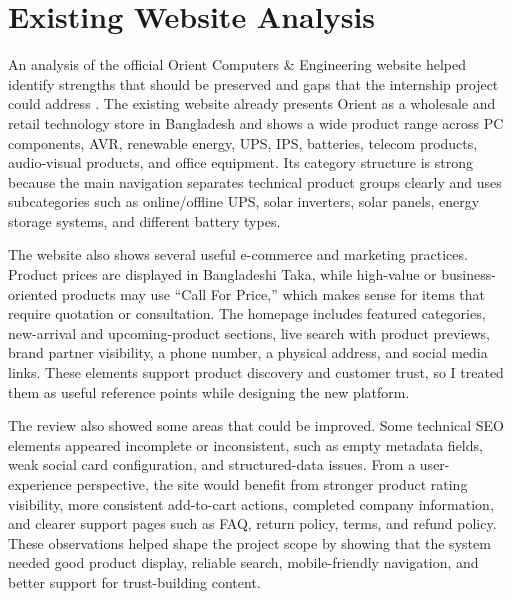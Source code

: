 \documentclass[12pt,a4paper,oneside]{report}
\begin{document}
\section{Existing Website Analysis}
An analysis of the official Orient Computers \& Engineering website helped identify strengths that should be preserved and gaps that the internship project could address \cite{orient_official}. The existing website already presents Orient as a wholesale and retail technology store in Bangladesh and shows a wide product range across PC components, AVR, renewable energy, UPS, IPS, batteries, telecom products, audio-visual products, and office equipment. Its category structure is strong because the main navigation separates technical product groups clearly and uses subcategories such as online/offline UPS, solar inverters, solar panels, energy storage systems, and different battery types.

The website also shows several useful e-commerce and marketing practices. Product prices are displayed in Bangladeshi Taka, while high-value or business-oriented products may use ``Call For Price,'' which makes sense for items that require quotation or consultation. The homepage includes featured categories, new-arrival and upcoming-product sections, live search with product previews, brand partner visibility, a phone number, a physical address, and social media links. These elements support product discovery and customer trust, so I treated them as useful reference points while designing the new platform.

The review also showed some areas that could be improved. Some technical SEO elements appeared incomplete or inconsistent, such as empty metadata fields, weak social card configuration, and structured-data issues. From a user-experience perspective, the site would benefit from stronger product rating visibility, more consistent add-to-cart actions, completed company information, and clearer support pages such as FAQ, return policy, terms, and refund policy. These observations helped shape the project scope by showing that the system needed good product display, reliable search, mobile-friendly navigation, and better support for trust-building content.
\end{document}
